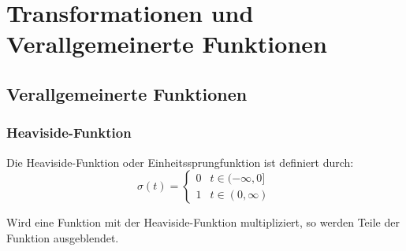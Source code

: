 \documentclass[12pt, a4paper]{scrreprt}
\begin{document}
\part{Transformationen und Verallgemeinerte Funktionen}

\chapter{Verallgemeinerte Funktionen}

\section{Heaviside-Funktion}
\begin{minipage}{.5\textwidth}
  Die Heaviside-Funktion oder Einheitssprungfunktion ist definiert durch:
  \[
    \sigma (t) =
    \begin{cases}
      0 & t \in (-\infty, 0]\\
    1 & t \in (0, \infty)
  \end{cases}
\]
\end{minipage}\hfill%
\begin{minipage}{.5\textwidth}
  \centering
\end{minipage}

\begin{minipage}{.5\textwidth}
  Wird eine Funktion mit der Heaviside-Funktion multipliziert, so werden Teile der Funktion ausgeblendet.
\end{minipage}\hfill%
\begin{minipage}{.5\textwidth}
  \centering
\end{minipage}
\end{document}
